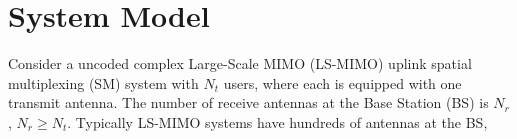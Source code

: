 \documentclass[12pt, draftclsnofoot, onecolumn]{IEEEtran}
\begin{document}
\section{System Model}
% 
% 
% 
% 

 
Consider a uncoded complex Large-Scale MIMO (LS-MIMO) uplink spatial multiplexing (SM) system with $N_{t}$ users, where each is equipped with one transmit antenna. The number of receive antennas at the Base Station (BS) is $N_{r}$, $N_{r}\geq N_{t}$. Typically LS-MIMO systems have hundreds of antennas at the BS, 
    
\end{document}
